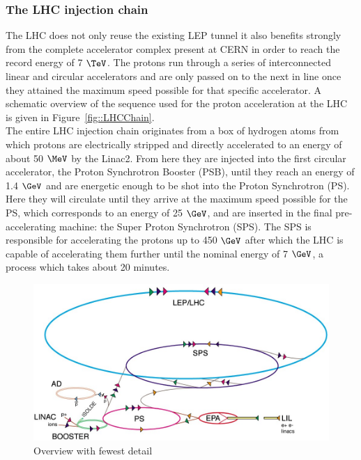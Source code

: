 \subsubsection{The LHC injection chain}
The LHC does not only reuse the existing LEP tunnel it also benefits strongly from the complete accelerator complex present at CERN in order to reach the record energy of 7 $\TeV$. 
The protons run through a series of interconnected linear and circular accelerators and are only passed on to the next in line once they attained the maximum speed possible for that specific accelerator. A schematic overview of the sequence used for the proton acceleration at the LHC is given in Figure~\ref{fig::LHCChain}.\\
The entire LHC injection chain originates from a box of hydrogen atoms from which protons are electrically stripped and directly accelerated to an energy of about 50 $\MeV$ by the Linac2.
From here they are injected into the first circular accelerator, the Proton Synchrotron Booster (PSB), until they reach an energy of 1.4 $\GeV$ and are energetic enough to be shot into the Proton Synchrotron (PS). Here they will circulate until they arrive at the maximum speed possible for the PS, which corresponds to an energy of 25 $\GeV$, and are inserted in the final pre-accelerating machine: the Super Proton Synchrotron (SPS). The SPS is responsible for accelerating the protons up to 450 $\GeV$ after which the LHC is capable of accelerating them further until the nominal energy of 7 $\GeV$, a process which takes about 20 minutes.

\begin{figure}[h!t]
 \centering
 \includegraphics[width = 0.8 \textwidth]{Chapters/Chapter2_CERN/Figures/CERNAcceleratorComplex_Few.jpg}
 \caption{Overview with fewest detail}
\end{figure}

